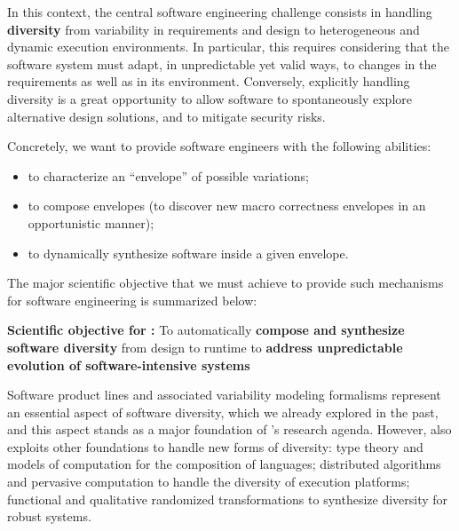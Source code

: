   In this context, the central software engineering challenge consists in handling \textbf{diversity} from variability in requirements and design to heterogeneous and dynamic execution environments. 
  In particular, this requires considering that the software system must adapt, in unpredictable yet valid ways, to changes in the requirements as well as in its environment. 
  Conversely, explicitly handling diversity is a great opportunity to allow software to spontaneously explore alternative design solutions, and to mitigate security risks.
  
  Concretely, we want to provide software engineers with the following abilities:
  \begin{itemize}\itemsep0cm
      \item to characterize an ``envelope'' of possible variations;
      \item to compose envelopes (to discover new macro correctness envelopes in an opportunistic manner);
      \item to dynamically synthesize software inside a given envelope.
  \end{itemize}

  The major scientific objective that we must achieve to provide such mechanisms for software engineering is summarized below:

    \textbf{Scientific objective for \team{}:} To automatically \textbf{compose and synthesize software diversity} from design to runtime to \textbf{address unpredictable evolution of software-intensive systems} 

  Software product lines and associated variability modeling formalisms represent an essential aspect of software diversity, which we already explored in the past, and this aspect stands as a major foundation of \team{}'s research agenda. 
  However, \team{}  also exploits other foundations to handle new forms of diversity: type theory and models of computation for the composition of languages; distributed algorithms and pervasive computation to handle the diversity of execution platforms;  functional and qualitative randomized transformations to synthesize diversity for robust systems.






